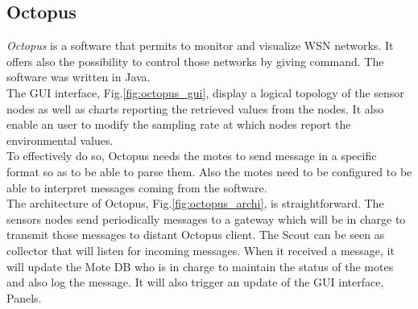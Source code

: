 \subsection{Octopus}

\textit{Octopus} \cite{jurdak2011octopus} is a software that permits to monitor and visualize WSN networks. It offers also the possibility to control those networks by giving command. The software was written in Java. \\

The GUI interface, Fig.\ref{fig:octopus_gui}, display a logical topology of the sensor nodes as well as charts reporting the retrieved values from the nodes. It also enable an user to modify the sampling rate at which nodes report the environmental values. \\

To effectively do so, Octopus needs the motes to send message in a specific format so as to be able to parse them. Also the motes need to be configured to be able to interpret messages coming from the software.\\

The architecture of Octopus, Fig.\ref{fig:octopus_archi}, is straightforward. The sensors nodes send periodically messages to a gateway which will be in charge to transmit those messages to distant Octopus client. The Scout can be seen as collector that will listen for incoming messages. When it received a message, it will update the Mote DB who is in charge to maintain the status of the motes and also log the message. It will also trigger an update of the GUI interface, Panels.

